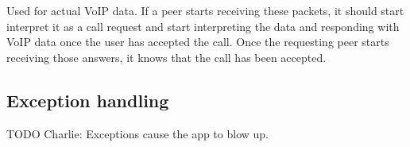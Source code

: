 \documentclass{article}
\begin{document}
\begin{itemize}
Used for actual VoIP data. If a peer starts receiving these packets, it should start interpret it as a call request and start interpreting the data and responding with VoIP data once the user has accepted the call. Once the requesting peer starts receiving  those answers, it knows that the call has been accepted.

\end{itemize}
\subsection{Exception handling}
TODO Charlie: Exceptions cause the app to blow up.
\end{document}
